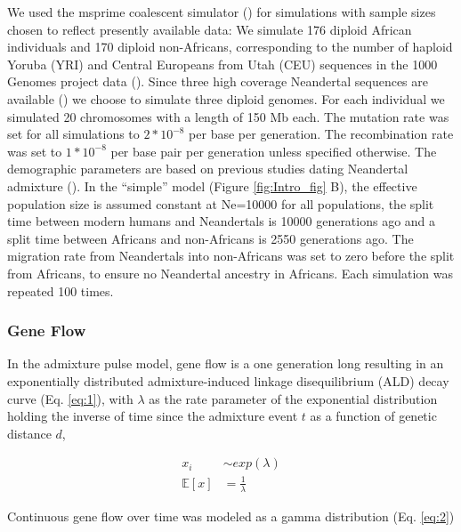\documentclass[]{article}
\begin{document}
We used the msprime coalescent simulator
(\cite{kelleher_efficient_2016}) for simulations with sample sizes
chosen to reflect presently available data: We simulate 176 diploid
African individuals and 170 diploid non-Africans, corresponding to the
number of haploid Yoruba (YRI) and Central Europeans from Utah (CEU)
sequences in the 1000 Genomes project data
(\cite{the_1000_genomes_project_consortium_global_2015}). Since three
high coverage Neandertal sequences are available
(\cite{prufer_complete_2013,prufer_high-coverage_2017}) we choose to
simulate three diploid genomes. For each individual we simulated 20
chromosomes with a length of 150 Mb each. The mutation rate was set for
all simulations to \(2*10^{-8}\) per base per generation. The
recombination rate was set to \(1*10^{-8}\) per base pair per generation
unless specified otherwise. The demographic parameters are based on
previous studies dating Neandertal admixture
(\cite{sankararaman_date_2012,fu_genome_2014,moorjani_genetic_2016}). In
the ``simple'' model (Figure \ref{fig:Intro_fig} B), the effective
population size is assumed constant at Ne=10000 for all populations, the
split time between modern humans and Neandertals is 10000 generations
ago and a split time between Africans and non-Africans is 2550
generations ago. The migration rate from Neandertals into non-Africans
was set to zero before the split from Africans, to ensure no Neandertal
ancestry in Africans. Each simulation was repeated 100 times.

\subsubsection{Gene Flow}\label{gene flow}

In the admixture pulse model, gene flow is a one generation long
resulting in an exponentially distributed admixture-induced linkage
disequilibrium (ALD) decay curve (Eq. \ref{eq:1}), with \(\lambda\) as
the rate parameter of the exponential distribution holding the inverse
of time since the admixture event \(t\) as a function of genetic
distance \(d\),

\begin{equation}
\begin{split}
\label{eq:1}
x_i &\sim exp(\lambda) \\
\mathbb{E}[x] &= \frac{1}{\lambda}
\end{split}
\end{equation}

Continuous gene flow over time was modeled as a gamma distribution (Eq.
\ref{eq:2})
\end{document}
